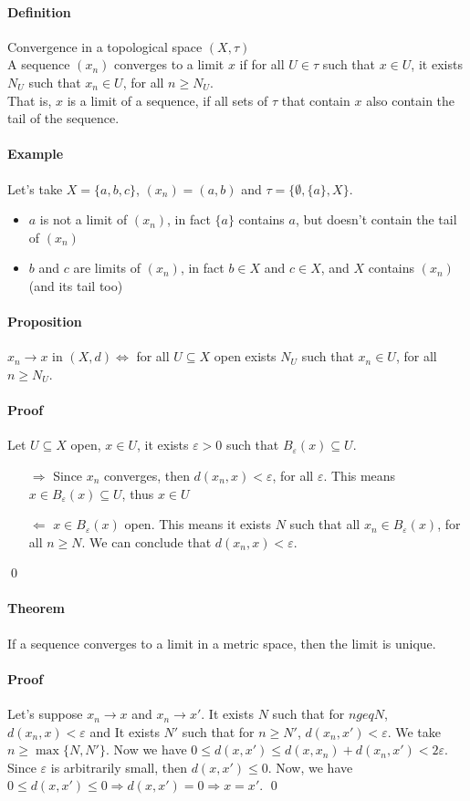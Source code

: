 \documentclass{article}
\newcommand{\Ep}{\varepsilon}
\newcommand{\Def}{\paragraph{Definition}}
\newcommand{\Proposition}{\paragraph{Proposition}}
\newcommand{\Theorem}{\paragraph{Theorem}}
\newcommand{\Proof}{\paragraph{Proof}}
\newcommand{\Example}{\paragraph{Example}}
\begin{document}
  \Def Convergence in a topological space $(X, \tau)$
\\A sequence $(x_n)$ converges to a limit $x$ if for all $U \in \tau$ such that
  $x \in U$, it exists $N_U$ such that $x_n \in U$, for all $n \geq N_U$.
\\That is, $x$ is a limit of a sequence, if all sets of $\tau$ that contain $x$
  also contain the tail of the sequence.

  \Example Let's take $X = \{ a, b, c \}$, $(x_n) = (a, b)$ and $\tau =
  \{ \emptyset, \{ a \}, X \}$.
  \begin{itemize}
    \item $a$ is not a limit of $(x_n)$, in fact $\{ a \}$ contains $a$, but
    doesn't contain the tail of $(x_n)$
    \item $b$ and $c$ are limits of $(x_n)$, in fact $b \in X$ and $c \in X$,
    and $X$ contains $(x_n)$ (and its tail too)
  \end{itemize}

  \Proposition $x_n \to x$ in $(X, d) \iff$ for all $U \subseteq X$ open exists
  $N_U$ such that $x_n \in U$, for all $n \geq N_U$.

  \Proof Let $U \subseteq X$ open, $x \in U$, it exists $\Ep > 0$ such that
  $B_\Ep(x) \subseteq U$.
  \begin{itemize}
    \item[$\Rightarrow$] Since $x_n$ converges, then $d(x_n,x) < \Ep$, for
    all $\Ep$. This means $x \in B_\Ep(x) \subseteq U$, thus $x \in U$
    \item[$\Leftarrow$] $x \in B_\Ep(x)$ open. This means it exists $N$ such
    that all $x_n \in B_\Ep(x)$, for all $n \geq N$. We can conclude that
    $d(x_n,x) < \Ep$.
  \end{itemize}
  \qed

  \Theorem If a sequence converges to a limit in a metric space, then the limit
  is unique.

  \Proof Let's suppose $x_n \to x$ and $x_n \to x'$.
  It exists $N$ such that for $n geq N$, $d(x_n,x) < \Ep$ and It exists
  $N'$ such that for $n \geq N'$, $d(x_n,x') < \Ep$. We take $n \geq
  \max\{ N, N' \}$. Now we have $0 \leq d(x,x') \leq d(x,x_n) + d(x_n,x') <
  2\Ep$.
\\Since $\Ep$ is arbitrarily small, then $d(x,x') \leq 0$. Now, we have
  $0 \leq d(x,x') \leq 0 \Rightarrow d(x,x') = 0 \Rightarrow x = x'$.
  \qed
\end{document}
